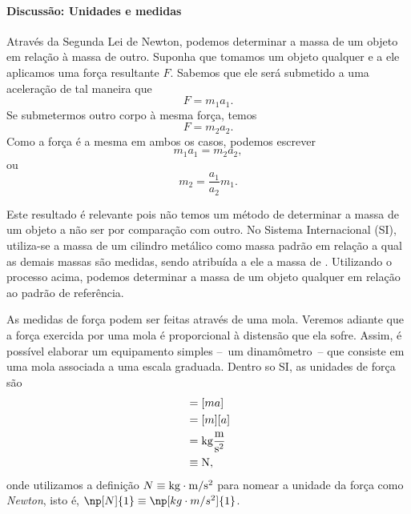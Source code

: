 \paragraph{Discussão: Unidades e medidas}

Através da Segunda Lei de Newton, podemos determinar a massa de um objeto em relação à massa de outro. Suponha que tomamos um objeto qualquer e a ele aplicamos uma força resultante $F$. Sabemos que ele será submetido a uma aceleração de tal maneira que
\begin{equation}
  F = m_1 a_1.
\end{equation}
%
Se submetermos outro corpo à mesma força, temos
\begin{equation}
  F = m_2 a_2.
\end{equation}
%
Como a força é a mesma em ambos os casos, podemos escrever
\begin{equation}
  m_1 a_1 = m_2 a_2,
\end{equation}
%
ou
\begin{equation}
  m_2 = \frac{a_1}{a_2}m_1.
\end{equation}

Este resultado é relevante pois não temos um método de determinar a massa de um objeto a não ser por comparação com outro. No Sistema Internacional (SI), utiliza-se a massa de um cilindro metálico como massa padrão em relação a qual as demais massas são medidas, sendo atribuída a ele a massa de . Utilizando o processo acima, podemos determinar a massa de um objeto qualquer em relação ao padrão de referência.

As medidas de força podem ser feitas através de uma mola. Veremos adiante que a força exercida por uma mola é proporcional à distensão que ela sofre. Assim, é possível elaborar um equipamento simples --~um dinamômetro~-- que consiste em uma mola associada a uma escala graduada. Dentro so SI, as unidades de força são
\begin{align}
    [F] &= [m a] \\
    &= [m] [a] \\
    &= \rm{kg} \frac{\rm{m}}{\rm{s}^2} \\
    &\equiv \rm{N},
\end{align}
%
onde utilizamos a definição $N \equiv \rm{kg}\cdot\rm{m}/\rm{s}^2$ para nomear a unidade da força como \emph{Newton}, isto é, $\np[N]{1} \equiv \np[kg\cdot m/s^2]{1}$.


